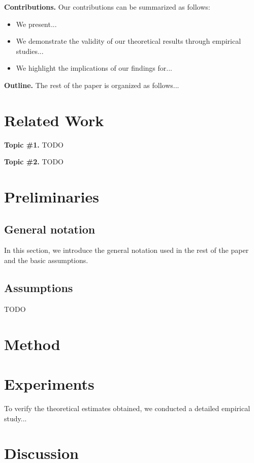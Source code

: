 \documentclass{article}
\begin{document}
\textbf{Contributions.} Our contributions can be summarized as follows:
\begin{itemize}
    \item We present...
    \item We demonstrate the validity of our theoretical results through empirical studies...
    \item We highlight the implications of our findings for...
\end{itemize}

\textbf{Outline.} The rest of the paper is organized as follows...

\section{Related Work}\label{sec:rw}

\textbf{Topic \#1.}
TODO

\textbf{Topic \#2.}
TODO

\section{Preliminaries}\label{sec:prelim}

\subsection{General notation}

In this section, we introduce the general notation used in the rest of the paper and the basic assumptions. 

\subsection{Assumptions} 

TODO

\section{Method}\label{sec:method}

\section{Experiments}\label{sec:exp}

To verify the theoretical estimates obtained, we conducted a detailed empirical study...

\section{Discussion}\label{sec:disc}
\end{document}
